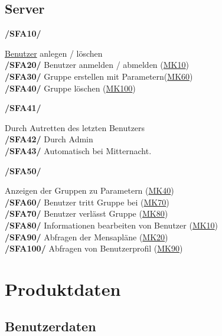 \documentclass[a4paper]{scrreprt}
\begin{document}
\section{Server}

\begin{addmargin}[25pt]{0pt} 
\hypertarget{sfa10}{\textbf{/SFA10/}} \hyperlink{benutzer}{Benutzer} anlegen / löschen\\
\hypertarget{sfa20}{\textbf{/SFA20/}} Benutzer anmelden / abmelden (\hyperlink{mk10}{MK10})\\
\hypertarget{sfa30}{\textbf{/SFA30/}} Gruppe erstellen mit Parametern(\hyperlink{mk60}{MK60})\\
\hypertarget{sfa40}{\textbf{/SFA40/}} Gruppe löschen (\hyperlink{mk100}{MK100})\\
	\begin{addmargin}[25pt]{0pt} 
	\hypertarget{sfa41}{\textbf{/SFA41/}} Durch Autretten des letzten Benutzers\\
	\hypertarget{sfa42}{\textbf{/SFA42/}} Durch Admin\\
	\hypertarget{sfa43}{\textbf{/SFA43/}} Automatisch bei Mitternacht.\\
	\end{addmargin}
\hypertarget{sfa50}{\textbf{/SFA50/}} Anzeigen der Gruppen zu Parametern (\hyperlink{m40}{MK40})\\
\hypertarget{sfa60}{\textbf{/SFA60/}} Benutzer tritt Gruppe bei (\hyperlink{m70}{MK70})\\
\hypertarget{sfa70}{\textbf{/SFA70/}} Benutzer verlässt Gruppe (\hyperlink{m80}{MK80})\\
\hypertarget{sfa80}{\textbf{/SFA80/}} Informationen bearbeiten von Benutzer (\hyperlink{m10}{MK10})\\
\hypertarget{sfa90}{\textbf{/SFA90/}} Abfragen der Mensapläne (\hyperlink{m20}{MK20})\\
\hypertarget{sfa100}{\textbf{/SFA100/}} Abfragen von Benutzerprofil (\hyperlink{m90}{MK90})\\
\end{addmargin}

\chapter{Produktdaten}

\section{Benutzerdaten}
\end{document}
